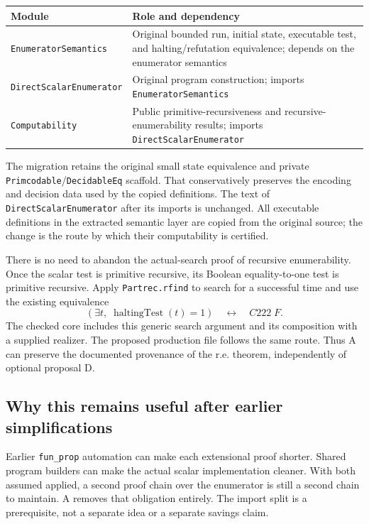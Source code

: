 \documentclass[11pt,a4paper]{article}
\newcommand{\code}[1]{\texttt{\small #1}}
\begin{document}
\begin{tabularx}{\textwidth}{@{}L{47mm}Y@{}}
\toprule
Module & Role and dependency \\
\midrule
\code{EnumeratorSemantics} & Original bounded run, initial state, executable test, and halting/refutation equivalence; depends on the enumerator semantics \\
\code{DirectScalarEnumerator} & Original program construction; imports \code{EnumeratorSemantics} \\
\code{Computability} & Public primitive-recursiveness and recursive-enumerability results; imports \code{DirectScalarEnumerator} \\
\bottomrule
\end{tabularx}

The migration retains the original small state equivalence and private \code{Primcodable}/\code{DecidableEq} scaffold. That conservatively preserves the encoding and decision data used by the copied definitions. The text of \code{DirectScalarEnumerator} after its imports is unchanged. All executable definitions in the extracted semantic layer are copied from the original source; the change is the route by which their computability is certified.

There is no need to abandon the actual-search proof of recursive enumerability. Once the scalar test is primitive recursive, its Boolean equality-to-one test is primitive recursive. Apply \code{Partrec.rfind} to search for a successful time and use the existing equivalence
\[
 (\exists t,\;\operatorname{haltingTest}(t)=1)\quad\longleftrightarrow\quad C222\;F.
\]
The checked core includes this generic search argument and its composition with a supplied realizer. The proposed production file follows the same route. Thus A can preserve the documented provenance of the r.e. theorem, independently of optional proposal D.

\subsection{Why this remains useful after earlier simplifications}

Earlier \code{fun\_prop} automation can make each extensional proof shorter. Shared program builders can make the actual scalar implementation cleaner. With both assumed applied, a second proof chain over the enumerator is still a second chain to maintain. A removes that obligation entirely. The import split is a prerequisite, not a separate idea or a separate savings claim.
\end{document}
